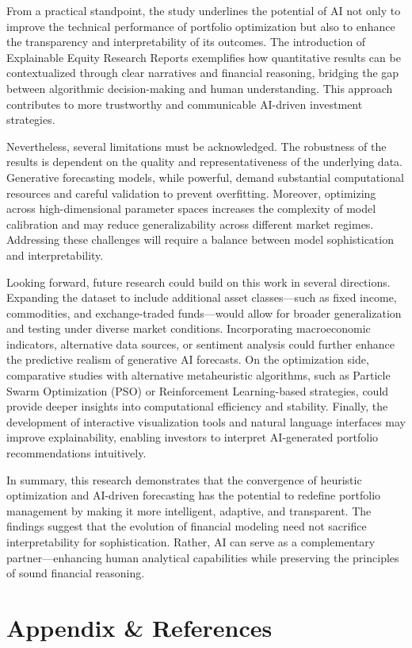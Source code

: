\documentclass{agasthesis}
\begin{document}
From a practical standpoint, the study underlines the potential of AI not only to improve the technical performance of portfolio optimization but also to enhance the transparency and interpretability of its outcomes. The introduction of Explainable Equity Research Reports exemplifies how quantitative results can be contextualized through clear narratives and financial reasoning, bridging the gap between algorithmic decision-making and human understanding. This approach contributes to more trustworthy and communicable AI-driven investment strategies. 

Nevertheless, several limitations must be acknowledged. The robustness of the results is dependent on the quality and representativeness of the underlying data. Generative forecasting models, while powerful, demand substantial computational resources and careful validation to prevent overfitting. Moreover, optimizing across high-dimensional parameter spaces increases the complexity of model calibration and may reduce generalizability across different market regimes. Addressing these challenges will require a balance between model sophistication and interpretability. 

Looking forward, future research could build on this work in several directions. Expanding the dataset to include additional asset classes—such as fixed income, commodities, and exchange-traded funds—would allow for broader generalization and testing under diverse market conditions. Incorporating macroeconomic indicators, alternative data sources, or sentiment analysis could further enhance the predictive realism of generative AI forecasts. On the optimization side, comparative studies with alternative metaheuristic algorithms, such as Particle Swarm Optimization (PSO) or Reinforcement Learning-based strategies, could provide deeper insights into computational efficiency and stability. Finally, the development of interactive visualization tools and natural language interfaces may improve explainability, enabling investors to interpret AI-generated portfolio recommendations intuitively. 

In summary, this research demonstrates that the convergence of heuristic optimization and AI-driven forecasting has the potential to redefine portfolio management by making it more intelligent, adaptive, and transparent. The findings suggest that the evolution of financial modeling need not sacrifice interpretability for sophistication. Rather, AI can serve as a complementary partner—enhancing human analytical capabilities while preserving the principles of sound financial reasoning. 

 
\chapter{Appendix & References}


\listoffigures
\cleardoublepage
\listoftables





\end{document}

